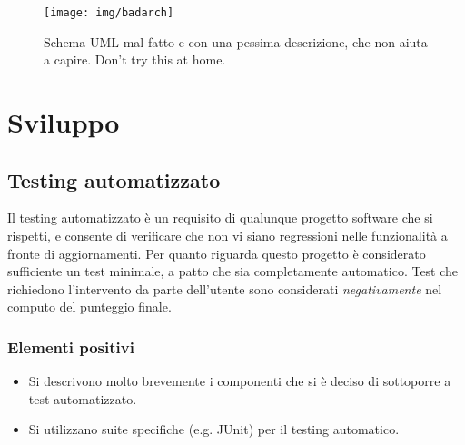 \documentclass[a4paper,12pt]{report}
\begin{document}
	
	\begin{figure}[h]
		\centering{}
		\texttt{[image: img/badarch]}
		\caption{Schema UML mal fatto e con una pessima descrizione, che non aiuta a capire. Don't try this at home.}
		\label{img:badarch}
	\end{figure}
	
	
	\chapter{Sviluppo}
	\section{Testing automatizzato}
	
	Il testing automatizzato è un requisito di qualunque progetto software che si rispetti, e consente di verificare che non vi siano regressioni nelle funzionalità a fronte di aggiornamenti.
	Per quanto riguarda questo progetto è considerato sufficiente un test minimale, a patto che sia completamente automatico.
	Test che richiedono l'intervento da parte dell'utente sono considerati \textit{negativamente} nel computo del punteggio finale.
	
	\subsection*{Elementi positivi}
	
	\begin{itemize}
		\item Si descrivono molto brevemente i componenti che si è deciso di sottoporre a test automatizzato.
		\item Si utilizzano suite specifiche (e.g. JUnit) per il testing automatico.
	\end{itemize}
	
\end{document}
